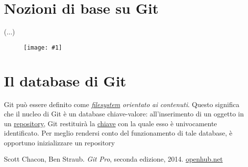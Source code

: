 \documentclass[12pt]{article}
\def\termimage[#1][#2]{
	\begin{figure}[h]
		\centering
		\texttt{[image: \#1]}
\end{figure}}
\begin{document}
\section{Nozioni di base su Git} %
(...)
\termimage[init.png][scale=1.5]
\section{Il database di Git} %
Git può essere definito come \textit{\underline{filesystem} orientato ai contenuti}. Questo significa che il nucleo di Git è un database chiave-valore: all'inserimento di un oggetto in un \underline{repository}, Git restituirà la \underline{chiave} con la quale esso è univocamente identificato. Per meglio rendersi conto del funzionamento di tale database, è opportuno inizializzare un repository

\newpage
\begin{thebibliography}{9}
	Scott Chacon, Ben Straub. \textit{Git Pro}, seconda edizione, 2014.
	\url{openhub.net}
\end{thebibliography}
\end{document}
